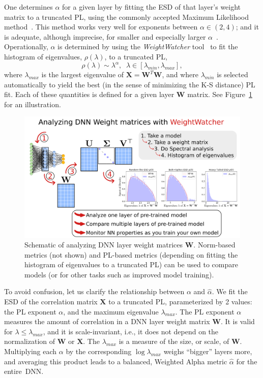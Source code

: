One determines $\alpha$ for a given layer by fitting the ESD of that layer's weight matrix to a truncated PL, using the commonly accepted Maximum Likelihood method~\cite{CSN09_powerlaw,ABP14}.
This method works very well for exponents between $\alpha\in(2,4)$; and it is adequate, although imprecise, for smaller and especially larger $\alpha$~\cite{newman2005_zipf}. 
%
Operationally, $\alpha$ is determined by using the \emph{WeightWatcher} tool~\cite{weightwatcher_package} to fit the histogram of eigenvalues, $\rho(\lambda)$, to a truncated PL, 
\begin{equation}
\rho(\lambda)\sim\lambda^{\alpha},\;\;\lambda\in[\lambda_{min},\lambda_{max}] ,
\end{equation}
where $\lambda_{max}$ is the largest eigenvalue of $\mathbf{X}=\mathbf{W}^{T}\mathbf{W}$, and 
where $\lambda_{min}$ is selected automatically to yield the best (in the sense of minimizing the K-S distance) PL fit.
Each of these quantities is defined for a given layer $\mathbf{W}$ matrix.
See Figure~\ref{fig:ww} for an illustration.

\begin{figure}[t]
    \centering
    \includegraphics[width=15.0cm]{img/WeightWatcher_v2}
    \caption{Schematic of analyzing DNN layer weight matrices $\mathbf{W}$.  Norm-based metrics (not shown) and PL-based metrics (depending on fitting the histogram of eigenvalues to a truncated PL) can be used to compare models (or for other tasks such as improved model training).}
    \label{fig:ww}
\end{figure}



To avoid confusion, let us clarify the relationship between $\alpha$ and $\hat{\alpha}$.  
We fit the ESD of the correlation matrix $\mathbf{X}$ to a truncated PL, parameterized by 2 values: the PL exponent $\alpha$, and the maximum eigenvalue $\lambda_{max}$.
The PL exponent $\alpha$ measures the amount of correlation in a DNN layer weight matrix $\mathbf{W}$. 
It is valid for $\lambda\le\lambda_{max}$, and it is scale-invariant, i.e., it does not depend on the normalization of $\mathbf{W}$ or $\mathbf{X}$.
The $\lambda_{max}$ is a measure of the size, or scale, of $\mathbf{W}$.
Multiplying each $\alpha$ by the corresponding $\log\lambda_{max}$ weighs ``bigger'' layers more, and averaging this product leads to a balanced, Weighted Alpha metric $\hat{\alpha}$ for the entire~DNN.


